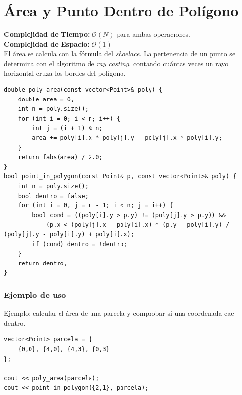 \documentclass[10pt,twocolumn,letterpaper]{report}
\begin{document}
\section{Área y Punto Dentro de Polígono}
\textbf{Complejidad de Tiempo:} $\mathcal{O}(N)$ para ambas operaciones. \\
\textbf{Complejidad de Espacio:} $\mathcal{O}(1)$ \\
El área se calcula con la fórmula del \textit{shoelace}. La pertenencia de un punto se determina con el algoritmo de \textit{ray casting}, contando cuántas veces un rayo horizontal cruza los bordes del polígono.
\begin{lstlisting}
double poly_area(const vector<Point>& poly) {
    double area = 0;
    int n = poly.size();
    for (int i = 0; i < n; i++) {
        int j = (i + 1) % n;
        area += poly[i].x * poly[j].y - poly[j].x * poly[i].y;
    }
    return fabs(area) / 2.0;
}
bool point_in_polygon(const Point& p, const vector<Point>& poly) {
    int n = poly.size();
    bool dentro = false;
    for (int i = 0, j = n - 1; i < n; j = i++) {
        bool cond = ((poly[i].y > p.y) != (poly[j].y > p.y)) &&
            (p.x < (poly[j].x - poly[i].x) * (p.y - poly[i].y) / (poly[j].y - poly[i].y) + poly[i].x);
        if (cond) dentro = !dentro;
    }
    return dentro;
}
\end{lstlisting}
\subsubsection*{Ejemplo de uso}
Ejemplo: calcular el área de una parcela y comprobar si una coordenada cae dentro.
\begin{lstlisting}
vector<Point> parcela = {
    {0,0}, {4,0}, {4,3}, {0,3}
};

cout << poly_area(parcela);
cout << point_in_polygon({2,1}, parcela);
\end{lstlisting}
\end{document}
